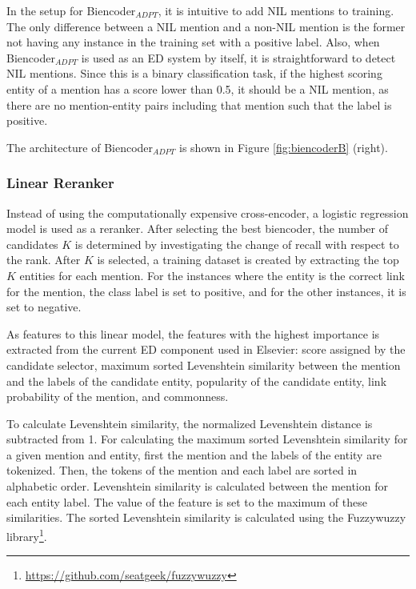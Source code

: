 \documentclass{report}
\theoremstyle{definition}
\theoremstyle{remark}
\begin{document}
In the setup for Biencoder$_{ADPT}$, it is intuitive to add NIL mentions to training. The only difference between a NIL mention and a non-NIL mention is the former not having any instance in the training set with a positive label. Also, when Biencoder$_{ADPT}$ is used as an ED system by itself, it is straightforward to detect NIL mentions. Since this is a binary classification task, if the highest scoring entity of a mention has a score lower than 0.5, it should be a NIL mention, as there are no mention-entity pairs including that mention such that the label is positive. 

The architecture of Biencoder$_{ADPT}$ is shown in Figure \ref{fig:biencoderB} (right).

\subsubsection{Linear Reranker}
Instead of using the computationally expensive cross-encoder, a logistic regression model is used as a reranker. After selecting the best biencoder, the number of candidates $K$ is determined by investigating the change of recall with respect to the rank. After $K$ is selected, a training dataset is created by extracting the top $K$ entities for each mention. For the instances where the entity is the correct link for the mention, the class label is set to positive, and for the other instances, it is set to negative.

As features to this linear model, the features with the highest importance is extracted from the current ED component used in Elsevier: score assigned by the candidate selector, maximum sorted Levenshtein similarity between the mention and the labels of the candidate entity, popularity of the candidate entity, link probability of the mention, and commonness.

To calculate Levenshtein similarity, the normalized Levenshtein distance is subtracted from 1. For calculating the maximum sorted Levenshtein similarity for a given mention and entity, first the mention and the labels of the entity are tokenized. Then, the tokens of the mention and each label are sorted in alphabetic order. Levenshtein similarity is calculated between the mention for each entity label. The value of the feature is set to the maximum of these similarities. The sorted Levenshtein similarity is calculated using the Fuzzywuzzy library\footnote{\url{https://github.com/seatgeek/fuzzywuzzy}}.
\end{document}

